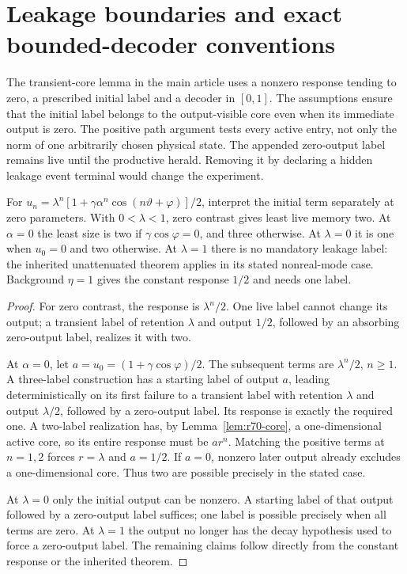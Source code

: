\section{Leakage boundaries and exact bounded-decoder conventions}\label{sec:supp-r70}
The transient-core lemma in the main article uses a nonzero response tending to zero, a prescribed initial label and a decoder in $[0,1]$. The assumptions ensure that the initial label belongs to the output-visible core even when its immediate output is zero. The positive path argument tests every active entry, not only the norm of one arbitrarily chosen physical state. The appended zero-output label remains live until the productive herald. Removing it by declaring a hidden leakage event terminal would change the experiment.

\begin{proposition}\label{prop:r70-degenerate}
For $u_n=\lambda^n[1+\gamma\alpha^n\cos(n\vartheta+\varphi)]/2$, interpret the initial term separately at zero parameters. With $0<\lambda<1$, zero contrast gives least live memory two. At $\alpha=0$ the least size is two if $\gamma\cos\varphi=0$, and three otherwise. At $\lambda=0$ it is one when $u_0=0$ and two otherwise. At $\lambda=1$ there is no mandatory leakage label: the inherited unattenuated theorem applies in its stated nonreal-mode case. Background $\eta=1$ gives the constant response $1/2$ and needs one label.
\end{proposition}
\begin{proof}
For zero contrast, the response is $\lambda^n/2$. One live label cannot change its output; a transient label of retention $\lambda$ and output $1/2$, followed by an absorbing zero-output label, realizes it with two.

At $\alpha=0$, let $a=u_0=(1+\gamma\cos\varphi)/2$. The subsequent terms are $\lambda^n/2$, $n\ge1$. A three-label construction has a starting label of output $a$, leading deterministically on its first failure to a transient label with retention $\lambda$ and output $\lambda/2$, followed by a zero-output label. Its response is exactly the required one. A two-label realization has, by Lemma~\ref{lem:r70-core}, a one-dimensional active core, so its entire response must be $a r^n$. Matching the positive terms at $n=1,2$ forces $r=\lambda$ and $a=1/2$. If $a=0$, nonzero later output already excludes a one-dimensional core. Thus two are possible precisely in the stated case.

At $\lambda=0$ only the initial output can be nonzero. A starting label of that output followed by a zero-output label suffices; one label is possible precisely when all terms are zero. At $\lambda=1$ the output no longer has the decay hypothesis used to force a zero-output label. The remaining claims follow directly from the constant response or the inherited theorem.
\end{proof}

